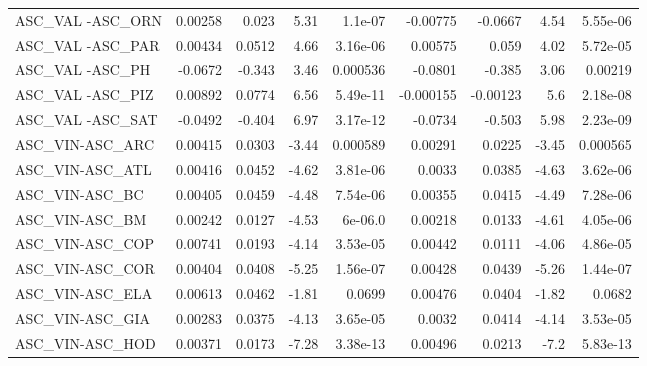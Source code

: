 \begin{tabular}{lrrrrrrrr}
ASC\_VAL -ASC\_ORN                        &     0.00258 &        0.023 &    5.31 &  1.1e-07 &   -0.00775 &     -0.0667 &         4.54 &      5.55e-06 \\
ASC\_VAL -ASC\_PAR                        &     0.00434 &       0.0512 &    4.66 & 3.16e-06 &    0.00575 &       0.059 &         4.02 &      5.72e-05 \\
ASC\_VAL -ASC\_PH                         &     -0.0672 &       -0.343 &    3.46 & 0.000536 &    -0.0801 &      -0.385 &         3.06 &       0.00219 \\
ASC\_VAL -ASC\_PIZ                        &     0.00892 &       0.0774 &    6.56 & 5.49e-11 &  -0.000155 &    -0.00123 &          5.6 &      2.18e-08 \\
ASC\_VAL -ASC\_SAT                        &     -0.0492 &       -0.404 &    6.97 & 3.17e-12 &    -0.0734 &      -0.503 &         5.98 &      2.23e-09 \\
ASC\_VIN-ASC\_ARC                         &     0.00415 &       0.0303 &   -3.44 & 0.000589 &    0.00291 &      0.0225 &        -3.45 &      0.000565 \\
ASC\_VIN-ASC\_ATL                         &     0.00416 &       0.0452 &   -4.62 & 3.81e-06 &     0.0033 &      0.0385 &        -4.63 &      3.62e-06 \\
ASC\_VIN-ASC\_BC                          &     0.00405 &       0.0459 &   -4.48 & 7.54e-06 &    0.00355 &      0.0415 &        -4.49 &      7.28e-06 \\
ASC\_VIN-ASC\_BM                          &     0.00242 &       0.0127 &   -4.53 &  6e-06.0 &    0.00218 &      0.0133 &        -4.61 &      4.05e-06 \\
ASC\_VIN-ASC\_COP                         &     0.00741 &       0.0193 &   -4.14 & 3.53e-05 &    0.00442 &      0.0111 &        -4.06 &      4.86e-05 \\
ASC\_VIN-ASC\_COR                         &     0.00404 &       0.0408 &   -5.25 & 1.56e-07 &    0.00428 &      0.0439 &        -5.26 &      1.44e-07 \\
ASC\_VIN-ASC\_ELA                         &     0.00613 &       0.0462 &   -1.81 &   0.0699 &    0.00476 &      0.0404 &        -1.82 &        0.0682 \\
ASC\_VIN-ASC\_GIA                         &     0.00283 &       0.0375 &   -4.13 & 3.65e-05 &     0.0032 &      0.0414 &        -4.14 &      3.53e-05 \\
ASC\_VIN-ASC\_HOD                         &     0.00371 &       0.0173 &   -7.28 & 3.38e-13 &    0.00496 &      0.0213 &         -7.2 &      5.83e-13 \\

\end{tabular}
